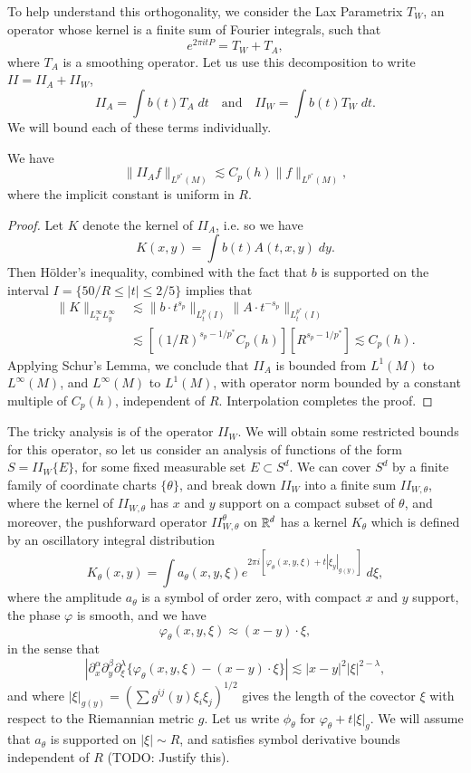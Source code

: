 To help understand this orthogonality, we consider the Lax Parametrix $T_W$, an operator whose kernel is a finite sum of Fourier integrals, such that
%
\[ e^{2 \pi i t P} = T_W + T_A, \]
%
where $T_A$ is a smoothing operator. Let us use this decomposition to write $II = II_A + II_W$,
%
\[ II_A = \int b(t) T_A\; dt \quad\text{and}\quad II_W = \int b(t) T_W\; dt. \]
%
We will bound each of these terms individually.

\begin{lemma}
    We have
    \[ \| II_A f \|_{L^{p^*}(M)} \lesssim C_p(h) \| f \|_{L^{p^*}(M)}, \]
    where the implicit constant is uniform in $R$.
\end{lemma}
\begin{proof}
    Let $K$ denote the kernel of $II_A$, i.e. so we have
    \[ K(x,y) = \int b(t) A(t,x,y)\; dy. \]
    Then H\"{o}lder's inequality, combined with the fact that $b$ is supported on the interval $I = \{ 50/R \leq |t| \leq 2/5 \}$ implies that
    \begin{align*}
        \| K \|_{L^\infty_x L^\infty_y} &\lesssim \| b \cdot t^{s_p} \|_{L^p_t(I)} \| A \cdot t^{-s_p} \|_{L^{p^*}_t(I)}\\
        &\lesssim \left[ (1/R)^{s_p - 1/p^*} C_p(h) \right] \left[ R^{s_p - 1/p^*} \right] \lesssim C_p(h).
    \end{align*}
    Applying Schur's Lemma, we conclude that $II_A$ is bounded from $L^1(M)$ to $L^\infty(M)$, and $L^\infty(M)$ to $L^1(M)$, with operator norm bounded by a constant multiple of $C_p(h)$, independent of $R$. Interpolation completes the proof.
\end{proof}

The tricky analysis is of the operator $II_W$. We will obtain some restricted bounds for this operator, so let us consider an analysis of functions of the form $S = II_W \{ E \}$, for some fixed measurable set $E \subset S^d$. We can cover $S^d$ by a finite family of coordinate charts $\{ \theta \}$, and break down $II_W$ into a finite sum $II_{W,\theta}$, where the kernel of $II_{W,\theta}$ has $x$ and $y$ support on a compact subset of $\theta$, and moreover, the pushforward operator $II_{W,\theta}^\theta$ on $\operatorname{\mathbb{R}}^d$ has a kernel $K_\theta$ which is defined by an oscillatory integral distribution
%
\[ K_\theta(x,y) = \int a_\theta(x,y,\xi) e^{2 \pi i [ \varphi_\theta(x,y,\xi) + t |\xi_y|_{g(y)} ]}\; d\xi, \]
%
where the amplitude $a_\theta$ is a symbol of order zero, with compact $x$ and $y$ support, the phase $\varphi$ is smooth, and we have
%
\[ \varphi_\theta(x,y,\xi) \approx (x - y) \cdot \xi, \]
%
in the sense that
%
\[ |\partial_x^\alpha \partial_y^\beta \partial_\xi^\lambda \{ \varphi_\theta(x,y,\xi) - (x - y) \cdot \xi \}| \lesssim |x - y|^2 |\xi|^{2 - \lambda}, \]
%
and where $|\xi|_{g(y)} = (\sum g^{ij}(y) \xi_i \xi_j )^{1/2}$ gives the length of the covector $\xi$ with respect to the Riemannian metric $g$. Let us write $\phi_\theta$ for $\varphi_\theta + t |\xi|_g$. We will assume that $a_\theta$ is supported on $|\xi| \sim R$, and satisfies symbol derivative bounds independent of $R$ (TODO: Justify this).

